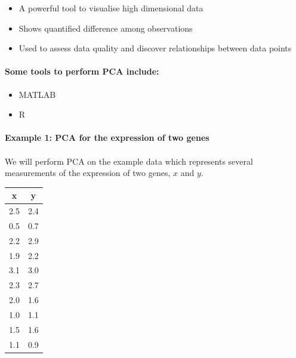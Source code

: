\documentclass[11pt, oneside]{article}   	%
\begin{document}
\begin{itemize}

   \item A powerful tool to visualise high dimensional data 

   \item Shows quantified difference among observations

   \item Used to assess data quality and discover relationships between data points
\end{itemize}



\paragraph{Some tools to perform PCA include:}

\begin{itemize}
   \item MATLAB
   \item R
\end{itemize}





\paragraph{Example 1: PCA for the expression of two genes}
\paragraph{}

We will perform PCA on the example data which represents several measurements of the expression of two genes, $x$ and $y$.

\begin{center}
\begin{tabular}{c|c}
   x & y \\
   \hline
   2.5 & 2.4\\
   0.5 & 0.7\\
   2.2 & 2.9\\
   1.9 & 2.2\\
   3.1 & 3.0\\
   2.3 & 2.7\\
   2.0 & 1.6\\
   1.0 & 1.1\\
   1.5 & 1.6\\
   1.1 & 0.9\\
   \hline
\end{tabular}
\end{center}
   
\end{document}
